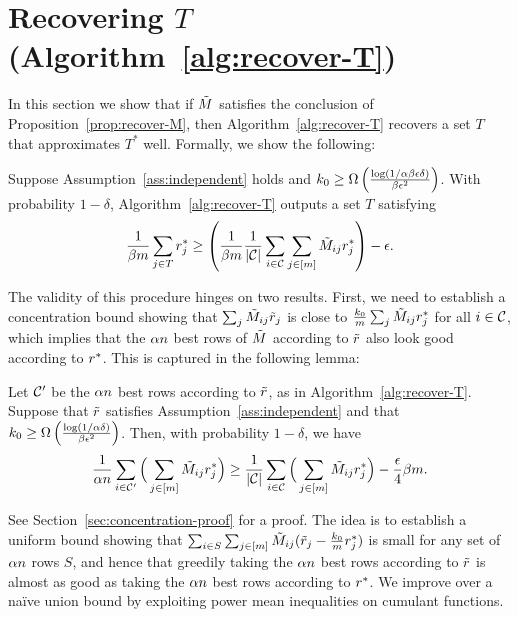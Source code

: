 \section{Recovering $T$ (Algorithm~\ref{alg:recover-T})}
\label{sec:approach-T}
\label{sec:rounding}

In this section we show that if $\tilde{M}$ satisfies the conclusion of 
Proposition~\ref{prop:recover-M}, then Algorithm~\ref{alg:recover-T} 
recovers a set $T$ that approximates $T^*$ well. Formally, we show 
the following:
\begin{proposition}
\label{prop:recover-T}
Suppose Assumption~\ref{ass:independent} holds and 
$k_0 \geq \Omega\left( \frac{\log(1/\alpha\beta\epsilon\delta)}{\beta\epsilon^2} \right)$. 
With probability $1-\delta$, Algorithm~\ref{alg:recover-T} outputs a set $T$ satisfying 
\begin{equation}
\label{eq:recover-T}
\frac{1}{\beta m}\sum_{j \in T} r^*_j \geq \left( \frac{1}{\beta m}\frac{1}{|\mathcal{C}|}\sum_{i \in \mathcal{C}} \sum_{j \in [m]} \tilde{M}_{ij}r^*_j \right) - \epsilon.
\end{equation}
\end{proposition}
The validity of this procedure hinges on two results. First, we need to establish 
a concentration bound showing that $\sum_j \tilde{M}_{ij}\tilde{r}_j$ is close to 
$\frac{k_0}{m}\sum_j \tilde{M}_{ij}r^*_j$ for all $i \in \mathcal{C}$, which implies that 
the $\alpha n$ best rows of $\tilde{M}$ according to $\tilde{r}$ also look good 
according to $r^*$. This is captured in the following lemma:
\begin{lemma}
\label{lem:robs-rtrue}
Let $\mathcal{C}'$ be the $\alpha n$ best rows according to $\tilde{r}$, as 
in Algorithm~\ref{alg:recover-T}. 
Suppose that $\tilde{r}$ satisfies Assumption~\ref{ass:independent} and that
$k_0 \geq \Omega\left( \frac{\log(1/\alpha\delta)}{\beta\epsilon^2} \right)$. 
Then, with probability $1-\delta$, we have
\begin{equation}
\label{eq:robs-rtrue}
\frac{1}{\alpha n} \sum_{i \in \mathcal{C}'} \Big(\sum_{j \in [m]} \tilde{M}_{ij}r^*_j\Big) \geq \frac{1}{|\mathcal{C}|} \sum_{i \in \mathcal{C}} \Big(\sum_{j \in [m]} \tilde{M}_{ij}r^*_j\Big) - \frac{\epsilon}{4}\beta m.
\end{equation}
\end{lemma}
See Section~\ref{sec:concentration-proof} for a proof.
The idea is to establish a uniform bound showing that 
$\sum_{i \in S} \sum_{j \in [m]} \tilde{M}_{ij}(\tilde{r}_j - \frac{k_0}{m}r^*_j)$ is small for any 
set of $\alpha n$ rows $S$, and hence that greedily taking the $\alpha n$ 
best rows according to $\tilde{r}$ is almost as good as taking the $\alpha n$ 
best rows according to $r^*$. We 
improve over a na\"{i}ve union bound by exploiting power mean 
inequalities on cumulant functions. 

